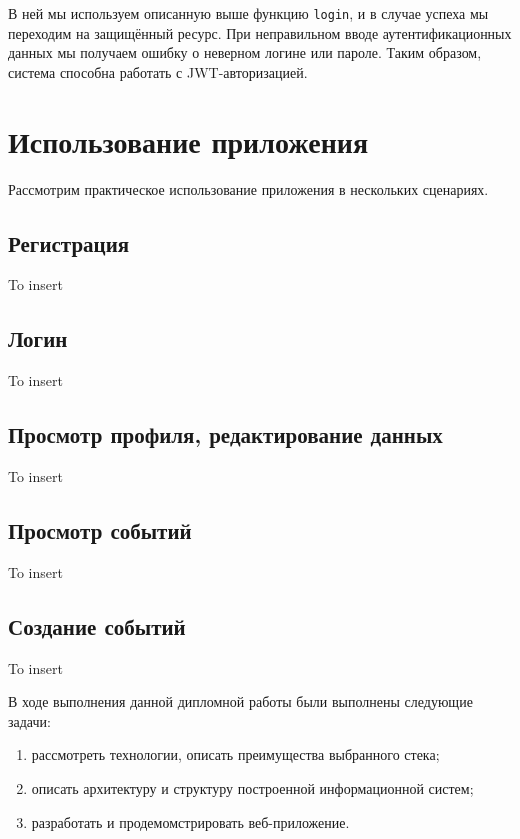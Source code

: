 \documentclass[diploma]{SCWorks}
\begin{document}
В ней мы используем описанную выше функцию \texttt{login}, и в случае успеха
мы переходим на защищённый ресурс. При неправильном вводе аутентификационных 
данных мы получаем ошибку о неверном логине или пароле. Таким образом, система
способна работать с JWT-авторизацией.

\section{Использование приложения}

Рассмотрим практическое использование приложения в нескольких сценариях.

\subsection{Регистрация}

To insert

\subsection{Логин}

To insert

\subsection{Просмотр профиля, редактирование данных}

To insert

\subsection{Просмотр событий}

To insert

\subsection{Создание событий}

To insert


\conclusion

В ходе выполнения данной дипломной работы были выполнены следующие задачи:
\begin{enumerate}
    \item рассмотреть технологии, описать преимущества выбранного стека;
    \item описать архитектуру и структуру построенной информационной систем;
    \item разработать и продемомстрировать веб-приложение.
\end{enumerate}
\end{document}
